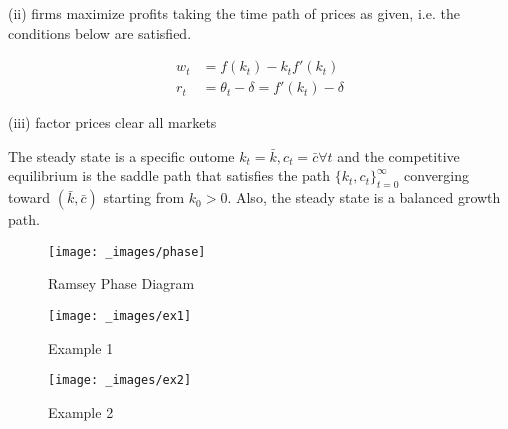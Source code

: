 \documentclass[twocolumn, fleqn]{article}
\begin{document}
		(ii) firms maximize profits taking the time path of prices as given, i.e. the conditions below are satisfied.

		\begin{align*}
			w_t &= f(k_t) - k_t f'(k_t)\\
			r_t &= \theta_t -\delta = f'(k_t) -\delta
		\end{align*}

		(iii) factor prices clear all markets

		\begin{note}
			The steady state is a specific outome $k_t = \bar{k}, c_t = \bar{c} \forall t$ and the competitive
			equilibrium is the saddle path that satisfies the path $\{k_t, c_t\}_{t=0}^{\infty}$ converging toward $(\bar{k}, \bar{c})$ starting from $k_0 >0$.
			Also, the steady state is a balanced growth path.
		\end{note}

		\newpage

		\onecolumn


		\begin{figure}
			\center
			\texttt{[image: \_images/phase]}
			\caption{Ramsey Phase Diagram}\label{fig:phase}
		\end{figure}

			\begin{figure}
				\center
				\texttt{[image: \_images/ex1]}
				\caption{Example 1}\label{fig:ex1}
			\end{figure}

			\begin{figure}
				\center
				\texttt{[image: \_images/ex2]}
				\caption{Example 2}\label{fig:ex2}
			\end{figure}
		\twocolumn
\end{document}

